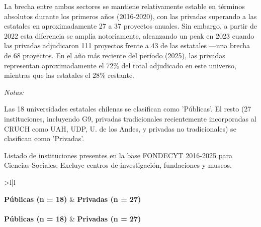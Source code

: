 \documentclass[
  12pt,
  letterpaper,
]{article}
\begin{document}
La brecha entre ambos sectores se mantiene relativamente estable en
términos absolutos durante los primeros años (2016-2020), con las
privadas superando a las estatales en aproximadamente 27 a 37 proyectos
anuales. Sin embargo, a partir de 2022 esta diferencia se amplía
notoriamente, alcanzando un peak en 2023 cuando las privadas adjudicaron
111 proyectos frente a 43 de las estatales ---una brecha de 68
proyectos. En el año más reciente del período (2025), las privadas
representan aproximadamente el 72\% del total adjudicado en este
universo, mientras que las estatales el 28\% restante.

\begingroup\fontsize{10}{12}\selectfont

\begin{ThreePartTable}
\begin{TableNotes}
\item \textit{Notas:} 
\item Las 18 universidades estatales chilenas se clasifican como 'Públicas'. El resto (27 instituciones, incluyendo G9, privadas tradicionales recientemente incorporadas al CRUCH como UAH, UDP, U. de los Andes, y privadas no tradicionales) se clasifican como 'Privadas'.
\item Listado de instituciones presentes en la base FONDECYT 2016-2025 para Ciencias Sociales. Excluye centros de investigación, fundaciones y museos.
\end{TableNotes}

\begin{longtable}[t]{>{}l|l}

\caption{\label{tbl-clasificacion-publica-privada}Clasificación de
instituciones según naturaleza jurídica: estatales vs privadas}

\tabularnewline

\toprule
\textbf{Públicas (n = 18)} & \textbf{Privadas (n = 27)}\\
\midrule
\endfirsthead
{}\\
\toprule
\textbf{Públicas (n = 18)} & \textbf{Privadas (n = 27)}\\
\midrule
\endhead


\end{longtable}
\end{ThreePartTable}
\end{document}
